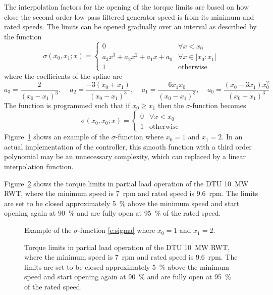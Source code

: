 The interpolation factors for the opening of the torque limits are based on how close the second order low-pass filtered generator speed is from its minimum and rated speeds. The limits can be opened gradually over an interval as described by the function
\begin{equation}\label{e:sigma}
\sigma\left(x_0,x_1;x\right) = \left\{
\begin{array}{rl}
0 & \forall x<x_0 \\
a_3x^3 + a_2x^2 + a_1x + a_0& \forall x\in[x_0:x_1[\\
1 & \mbox{otherwise}
\end{array} \right.
\end{equation}
where the coefficients of the spline are
\begin{equation}\label{e:sigmacoef}
a_3=\frac{2}{\left(x_0-x_1\right)^3}, \;\;\;\;
a_2=\frac{-3 \left(x_0+x_1\right)}{\left(x_0-x_1\right)^3}, \;\;\;\;
a_1=\frac{6 x_1 x_0}{\left(x_0-x_1\right)^3}, \;\;\;\;
a_0=\frac{\left(x_0-3 x_1\right) x_0^2}{\left(x_0-x_1\right)^3}
\end{equation}
The function is programmed such that if $x_0 \geq x_1$ then the $\sigma$-function becomes
\begin{equation}\label{e:sigma_if}
\sigma\left(x_0,x_0;x\right) = \left\{
\begin{array}{rl}
0 & \forall x<x_0 \\
1 & \mbox{otherwise}
\end{array} \right.
\end{equation}
Figure~\ref{f:sigma} shows an example of the $\sigma$-function where $x_0=1$ and $x_1=2$. In an actual implementation of the controller, this smooth function with a third order polynomial may be an unnecessary complexity, which can replaced by a linear interpolation function.

Figure~\ref{f:torque_limits} shows the torque limits in partial load operation of the DTU 10~MW RWT, where the minimum speed is 7~rpm and rated speed is 9.6~rpm. The limits are set to be closed approximately 5~\% above the minimum speed and start opening again at 90~\% and are fully open at 95~\% of the rated speed.

\begin{figure}[t]
\centerline{ }
\caption{Example of the $\sigma$-function \eqref{e:sigma} where $x_0=1$ and $x_1=2$. \label{f:sigma}}
\end{figure}

\begin{figure}[t]
\centerline{ }
\caption{Torque limits in partial load operation of the DTU 10~MW RWT, where the minimum speed is 7~rpm and rated speed is 9.6~rpm. The limits are set to be closed approximately 5~\% above the minimum speed and start opening again at 90~\% and are fully open at 95~\% of the rated speed. \label{f:torque_limits}}
\end{figure}

